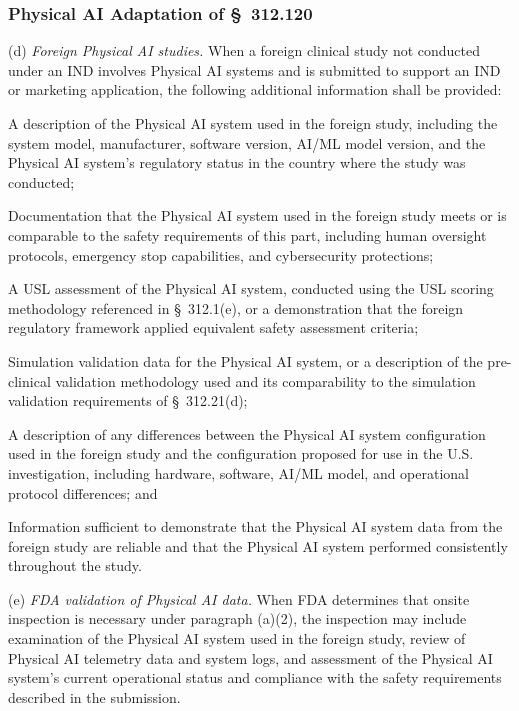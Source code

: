 \documentclass[11pt]{article}
\begin{document}
\subsubsection{Physical AI Adaptation of \S~312.120}

(d) \textit{Foreign Physical AI studies.} When a foreign clinical study not conducted under an IND involves Physical AI systems and is submitted to support an IND or marketing application, the following additional information shall be provided:

\begin{description}[leftmargin=0.8cm,style=sameline]
\item[(i)] A description of the Physical AI system used in the foreign study, including the system model, manufacturer, software version, AI/ML model version, and the Physical AI system's regulatory status in the country where the study was conducted;
\item[(ii)] Documentation that the Physical AI system used in the foreign study meets or is comparable to the safety requirements of this part, including human oversight protocols, emergency stop capabilities, and cybersecurity protections;
\item[(iii)] A USL assessment of the Physical AI system, conducted using the USL scoring methodology referenced in \S~312.1(e), or a demonstration that the foreign regulatory framework applied equivalent safety assessment criteria;
\item[(iv)] Simulation validation data for the Physical AI system, or a description of the pre-clinical validation methodology used and its comparability to the simulation validation requirements of \S~312.21(d);
\item[(v)] A description of any differences between the Physical AI system configuration used in the foreign study and the configuration proposed for use in the U.S. investigation, including hardware, software, AI/ML model, and operational protocol differences; and
\item[(vi)] Information sufficient to demonstrate that the Physical AI system data from the foreign study are reliable and that the Physical AI system performed consistently throughout the study.
\end{description}

(e) \textit{FDA validation of Physical AI data.} When FDA determines that onsite inspection is necessary under paragraph (a)(2), the inspection may include examination of the Physical AI system used in the foreign study, review of Physical AI telemetry data and system logs, and assessment of the Physical AI system's current operational status and compliance with the safety requirements described in the submission.
\end{document}

